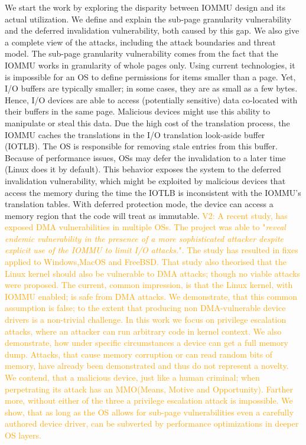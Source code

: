 We start the work by exploring the disparity between IOMMU design and its actual utilization. We define and explain the sub-page granularity vulnerability and the deferred invalidation vulnerability, both caused by this gap. We also give a complete view of the attacks, including the attack boundaries and threat model. The sub-page granularity vulnerability comes from the fact that the IOMMU works in granularity of whole pages only. Using current technologies, it is impossible for an OS to define permissions for items smaller than a page. Yet, I/O buffers are typically smaller; in some cases, they are as small as a few bytes. Hence, I/O devices are able to access (potentially sensitive) data co-located with their buffers in the same page. Malicious devices might use this ability to manipulate or steal this data. Due the high cost of the translation process, the IOMMU caches the translations in the I/O translation look-aside buffer (IOTLB). The OS is responsible for removing stale entries from this buffer. Because of performance issues, OSs may defer the invalidation to a later time (Linux does it by default). This behavior exposes the system to the deferred invalidation vulnerability, which might be exploited by malicious devices that access the memory during the time the IOTLB is inconsistent with the IOMMU’s translation tables. With deferred protection mode, the device can access a memory region that the code will treat as immutable.
\textcolor{orange}{V2:\newline 
A recent study\cite{thunder}, has exposed DMA vulnerabilities in multiple OSs. The project was able to "\emph{reveal endemic vulnerability in the presence of a more sophisticated attacker despite explicit use of the IOMMU to limit I/O attacks.}". The study has resulted in fixes applied to Windows,MacOS and FreeBSD. That study also theorised that the Linux kernel should also be vulnerable to DMA attacks; though no viable attacks were proposed. The current, common impression, is that the Linux kernel, with IOMMU enabled; is safe from DMA attacks. We demonstrate, that this common assumption is false; to the extent that producing non DMA-vulnerable device drivers is a non-trivial challenge. In this work we focus on privilege escalation attacks, where an attacker can run arbitrary code in kernel context. We also demonstrate, how under specific circumstances a device can get a full memory dump. Attacks, that cause memory corruption or can read random bits of memory, have already been demonstrated \cite{MMT16,thunder} and thus do not represent a novelty. We contend, that a malicious device, just like a human criminal; when perpetrating its attack has an MMO(Means, Motive and Opportunity). Farther more, without either of the three a privilege escalation attack is impossible. We show, that as long as the OS allows for sub-page vulnerabilities even a carefully authored device driver, can be subverted by performance optimizations in deeper OS layers.
}
